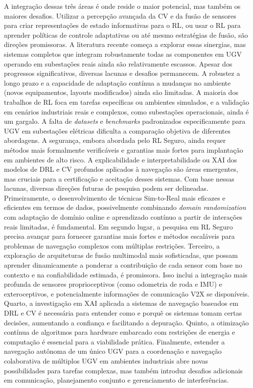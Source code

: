 A integração dessas três áreas é onde reside o maior potencial, mas também os maiores desafios. Utilizar a percepção avançada da \ac{CV} e da fusão de sensores para criar representações de estado informativas para o \ac{RL}, ou usar o \ac{RL} para aprender políticas de controle adaptativas ou até mesmo estratégias de fusão, são direções promissoras. A literatura recente começa a explorar essas sinergias, mas sistemas completos que integram robustamente todas as componentes em \ac{UGV} operando em subestações reais ainda são relativamente escassos.
Apesar dos progressos significativos, diversas lacunas e desafios permanecem. A robustez a longo prazo e a capacidade de adaptação contínua a mudanças no ambiente (novos equipamentos, layouts modificados) ainda são limitadas. A maioria dos trabalhos de \ac{RL} foca em tarefas específicas ou ambientes simulados, e a validação em cenários industriais reais e complexos, como subestações operacionais, ainda é um gargalo. A falta de \textit{datasets} e \textit{benchmarks} padronizados especificamente para \ac{UGV} em subestações elétricas dificulta a comparação objetiva de diferentes abordagens. A segurança, embora abordada pelo \ac{RL} Seguro, ainda requer métodos mais formalmente verificáveis e garantias mais fortes para implantação em ambientes de alto risco. A explicabilidade e interpretabilidade ou \ac{XAI} dos modelos de DRL e \ac{CV} profundos aplicados à navegação são áreas emergentes, mas cruciais para a certificação e aceitação desses sistemas.
Com base nessas lacunas, diversas direções futuras de pesquisa podem ser delineadas. Primeiramente, o desenvolvimento de técnicas Sim-to-Real mais eficazes e eficientes em termos de dados, possivelmente combinando \textit{domain randomization} com adaptação de domínio online e aprendizado contínuo a partir de interações reais limitadas, é fundamental. Em segundo lugar, a pesquisa em \ac{RL} Seguro precisa avançar para fornecer garantias mais fortes e métodos escaláveis para problemas de navegação complexos com múltiplas restrições. Terceiro, a exploração de arquiteturas de fusão multimodal mais sofisticadas, que possam aprender dinamicamente a ponderar a contribuição de cada sensor com base no contexto e na confiabilidade estimada, é promissora. Isso inclui a integração mais profunda de sensores proprioceptivos (como odometria de roda e \ac{IMU}) e exteroceptivos, e potencialmente informações de comunicação \ac{V2X} se disponíveis. Quarto, a investigação em \ac{XAI} aplicada a sistemas de navegação baseados em \ac{DRL} e \ac{CV} é necessária para entender como e porquê os sistemas tomam certas decisões, aumentando a confiança e facilitando a depuração. Quinto, a otimização contínua de algoritmos para hardware embarcado com restrições de energia e computação é essencial para a viabilidade prática. Finalmente, estender a navegação autônoma de um único \ac{UGV} para a coordenação e navegação colaborativa de múltiplos \ac{UGV} em ambientes industriais abre novas possibilidades para tarefas complexas, mas também introduz desafios adicionais em comunicação, planejamento conjunto e gerenciamento de interferências.
